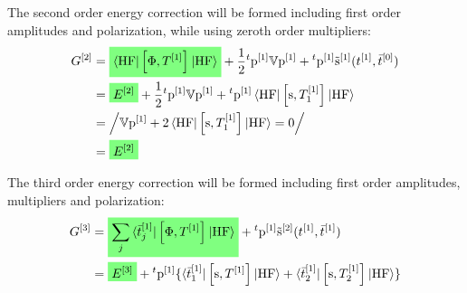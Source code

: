 The second order energy correction will be formed including first order
amplitudes and polarization, while using zeroth order multipliers:
\begin{equation}\label{eq:second-order-G}
  \begin{aligned}
  G^{[2]} &=
  \highlight{green}{
  \braket{\mathrm{HF} | \commutator{\Phi}{T^{[1]}} | \mathrm{HF}}
  }
  + \frac{1}{2}{}^t\p^{[1]}\V\p^{[1]} +
  {}^t\p^{[1]}\tilde{\s}^{[1]}(\tamp{}^{[1]}, \tbar{}^{[0]}) \\
  &= \highlight{green}{E^{[2]}}
  +
  \frac{1}{2}{}^t\p^{[1]}\V\p^{[1]}
  +
  {}^t\p^{[1]}\braket{\mathrm{HF} | \commutator{\s}{T^{[1]}_1} | \mathrm{HF}} \\
  &= \left/
  \V\p^{[1]} + 2\braket{\mathrm{HF} | \commutator{\s}{T_1^{[1]}}| \mathrm{HF}} = 0
  \right/ \\
  &= \highlight{green}{E^{[2]}}
  \end{aligned}
\end{equation}

The third order energy correction will be formed including first order
amplitudes, multipliers and polarization:
\begin{equation}\label{eq:third-order-G}
  \begin{aligned}
    G^{[3]} &=
    \highlight{green}{\sum_j\braket{\tbar{j}^{[1]} | \commutator{\Phi}{T^{[1]}} | \mathrm{HF}}}
    + {}^t\p^{[1]}\tilde{\s}^{[2]}(\tamp{}^{[1]}, \tbar{}^{[1]}) \\
    &=
    \highlight{green}{E^{[3]}}
    + {}^t\p^{[1]}
    \lbrace
      \braket{\tbar{1}^{[1]} | \commutator{\s}{T^{[1]}} | \mathrm{HF}}
    + \braket{\tbar{2}^{[1]} | \commutator{\s}{T^{[1]}_2} | \mathrm{HF}}
    \rbrace
  \end{aligned}
\end{equation}

